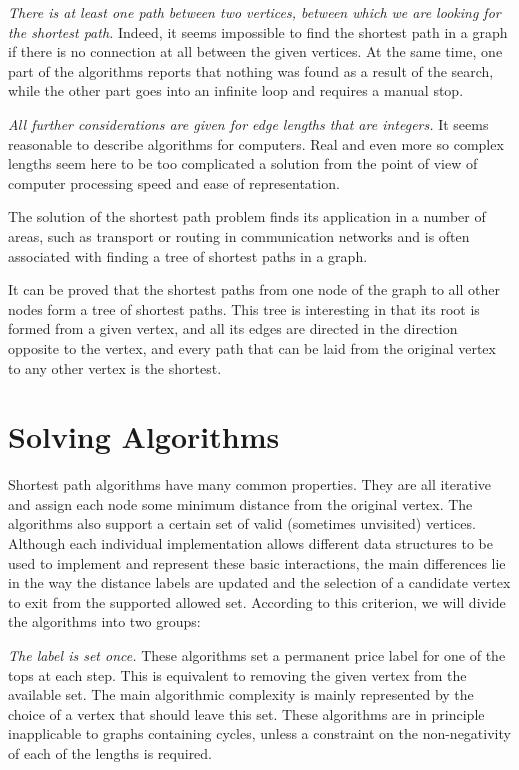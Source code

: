     \textit{There is at least one path between two vertices, between which we are looking for the shortest path.}
    Indeed, it seems impossible to find the shortest path in a graph if there is no connection at all between the given vertices.
    At the same time, one part of the algorithms reports that nothing was found as a result of the search, while the other part goes into an infinite loop and requires a manual stop.

    \textit{All further considerations are given for edge lengths that are integers.}
    It seems reasonable to describe algorithms for computers.
    Real and even more so complex lengths seem here to be too complicated a solution from the point of view of computer processing speed and ease of representation.

    The solution of the shortest path problem finds its application in a number of areas, such as transport or routing in communication networks and is often associated with finding a tree of shortest paths in a graph.
    
    It can be proved that the shortest paths from one node of the graph to all other nodes form a tree of shortest paths.
    This tree is interesting in that its root is formed from a given vertex, and all its edges are directed in the direction opposite to the vertex, and every path that can be laid from the original vertex to any other vertex is the shortest.
    
    \section{Solving Algorithms}
    Shortest path algorithms have many common properties.
    They are all iterative and assign each node some minimum distance from the original vertex.
    The algorithms also support a certain set of valid (sometimes unvisited) vertices.
    Although each individual implementation allows different data structures to be used to implement and represent these basic interactions, the main differences lie in the way the distance labels are updated and the selection of a candidate vertex to exit from the supported allowed set.
    According to this criterion, we will divide the algorithms into two groups:

    \textit{The label is set once.}
    These algorithms set a permanent price label for one of the tops at each step.
    This is equivalent to removing the given vertex from the available set.
    The main algorithmic complexity is mainly represented by the choice of a vertex that should leave this set.
    These algorithms are in principle inapplicable to graphs containing cycles, unless a constraint on the non-negativity of each of the lengths is required.


